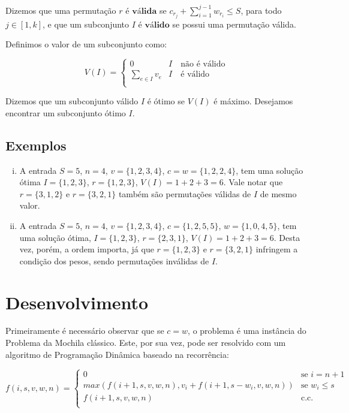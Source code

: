 Dizemos que uma permutação $r$ é $\textbf{válida}$ se $c_{r_j} + \sum_{i = 1}^{j - 1} w_{r_i} \leq S$, para todo $j \in [1, k]$, e que um subconjunto $I$ é $\textbf{válido}$ se possui uma permutação válida.

Definimos o valor de um subconjunto como:

\begin{equation} \label{pd:val}
  V(I) =
  \begin{cases}
  0                      & I\quad\text{não é válido} \\
  \sum_{e \in I} v_{e}   & I\quad\text{é válido} \\
  \end{cases}
\end{equation}

Dizemos que um subconjunto válido $I$ é ótimo se $V(I)$ é máximo. Desejamos encontrar um subconjunto ótimo $I$.

\subsection*{Exemplos}

\begin{enumerate}[i)]
    \item A entrada $S = 5$, $n = 4$, $v = \{1, 2, 3, 4\}$, $c = w = \{1, 2, 2, 4\}$, tem uma solução ótima $I = \{1, 2, 3\}$, $r = \{1, 2, 3\}$, $V(I) = 1 + 2 + 3 = 6$. Vale notar que $r = \{3, 1, 2\}$ e $r = \{3, 2, 1\}$ também são permutações válidas de $I$ de mesmo valor.
    \item A entrada $S = 5$, $n = 4$, $v = \{1, 2, 3, 4\}$, $c = \{1, 2, 5, 5\}$, $w = \{1, 0, 4, 5\}$, tem uma solução ótima, $I = \{1, 2, 3\}$, $r = \{2, 3, 1\}$, $V(I) = 1 + 2 + 3 = 6$. Desta vez, porém, a ordem importa, já que $r = \{1, 2, 3\}$ e $r = \{3, 2, 1\}$ infringem a condição dos pesos, sendo permutações inválidas de $I$. \label{pd:ex2}
\end{enumerate}

\section{Desenvolvimento}

Primeiramente é necessário observar que se $c = w$, o problema é uma instância do Problema da Mochila clássico. Este, por sua vez, pode ser resolvido com um algoritmo de Programação Dinâmica \cite{stefanot} baseado na recorrência:

\begin{equation} \label{pd:recnaiv}
  f(i, s, v, w, n) =
  \begin{cases}
  0                                                             & \text{se $i = n + 1$} \\
  max(f(i + 1, s, v, w, n), v_i + f(i + 1, s - w_i, v, w, n))   & \text{se $w_i \leq s$} \\
  f(i + 1, s, v, w, n)                                          & \text{c.c.} \\
  \end{cases}
\end{equation}

